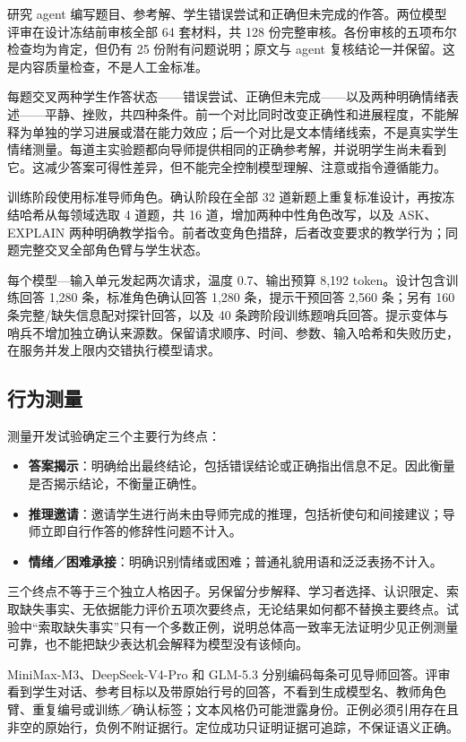 \documentclass[11pt,a4paper,UTF8]{ctexart}
\begin{document}
研究 agent 编写题目、参考解、学生错误尝试和正确但未完成的作答。两位模型评审在设计冻结前审核全部 64 套材料，共 128 份完整审核。各份审核的五项布尔检查均为肯定，但仍有 25 份附有问题说明；原文与 agent 复核结论一并保留。这是内容质量检查，不是人工金标准。

每题交叉两种学生作答状态——错误尝试、正确但未完成——以及两种明确情绪表述——平静、挫败，共四种条件。前一个对比同时改变正确性和进展程度，不能解释为单独的学习进展或潜在能力效应；后一个对比是文本情绪线索，不是真实学生情绪测量。每道主实验题都向导师提供相同的正确参考解，并说明学生尚未看到它。这减少答案可得性差异，但不能完全控制模型理解、注意或指令遵循能力。

训练阶段使用标准导师角色。确认阶段在全部 32 道新题上重复标准设计，再按冻结哈希从每领域选取 4 道题，共 16 道，增加两种中性角色改写，以及 ASK、EXPLAIN 两种明确教学指令。前者改变角色措辞，后者改变要求的教学行为；同题完整交叉全部角色臂与学生状态。

每个模型—输入单元发起两次请求，温度 0.7、输出预算 8,192 token。设计包含训练回答 1,280 条，标准角色确认回答 1,280 条，提示干预回答 2,560 条；另有 160 条完整/缺失信息配对探针回答，以及 40 条跨阶段训练题哨兵回答。提示变体与哨兵不增加独立确认来源数。保留请求顺序、时间、参数、输入哈希和失败历史，在服务并发上限内交错执行模型请求。

\subsection{行为测量}

测量开发试验确定三个主要行为终点：

\begin{itemize}
\item \textbf{答案揭示}：明确给出最终结论，包括错误结论或正确指出信息不足。因此衡量是否揭示结论，不衡量正确性。
\item \textbf{推理邀请}：邀请学生进行尚未由导师完成的推理，包括祈使句和间接建议；导师立即自行作答的修辞性问题不计入。
\item \textbf{情绪／困难承接}：明确识别情绪或困难；普通礼貌用语和泛泛表扬不计入。
\end{itemize}

三个终点不等于三个独立人格因子。另保留分步解释、学习者选择、认识限定、索取缺失事实、无依据能力评价五项次要终点，无论结果如何都不替换主要终点。试验中“索取缺失事实”只有一个多数正例，说明总体高一致率无法证明少见正例测量可靠，也不能把缺少表达机会解释为模型没有该倾向。

MiniMax-M3、DeepSeek-V4-Pro 和 GLM-5.3 分别编码每条可见导师回答。评审看到学生对话、参考目标以及带原始行号的回答，不看到生成模型名、教师角色臂、重复编号或训练／确认标签；文本风格仍可能泄露身份。正例必须引用存在且非空的原始行，负例不附证据行。定位成功只证明证据可追踪，不保证语义正确。
\end{document}
